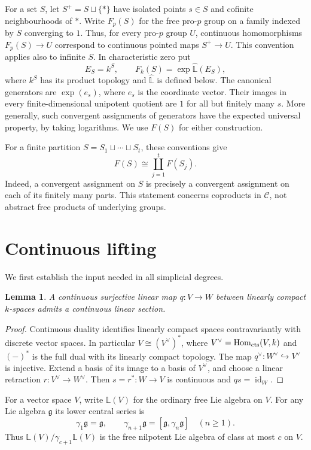 \documentclass[11pt,a4paper]{article}
\newtheorem{lemma}[theorem]{Lemma}
\theoremstyle{definition}
\newcommand{\C}{\mathcal C}
\newcommand{\Hom}{\operatorname{Hom}}
\newcommand{\LL}{\widehat{\mathbb L}}
\newcommand{\id}{\operatorname{id}}
\begin{document}
For a set $S$, let $S^+=S\sqcup\{*\}$ have isolated points $s\in S$
and cofinite neighbourhoods of $*$. Write $F_p(S)$ for the free pro-$p$
group on a family indexed by $S$ converging to $1$. Thus, for every
pro-$p$ group $U$, continuous homomorphisms $F_p(S)\to U$ correspond to
continuous pointed maps $S^+\to U$. This convention applies also to infinite $S$.
In characteristic zero put
\[
 E_S=k^S,\qquad F_k(S)=\exp\LL(E_S),
\]
where $k^S$ has its product topology and $\LL$ is defined below.
The canonical generators are $\exp(e_s)$, where $e_s$ is the coordinate
vector. Their images in every finite-dimensional unipotent quotient are
$1$ for all but finitely many $s$. More generally, such convergent
assignments of generators have the expected universal property, by
taking logarithms. We use $F(S)$ for either construction.

For a finite partition $S=S_1\sqcup\cdots\sqcup S_t$, these conventions give
\begin{equation}\label{eq:partition}
 F(S)\cong\coprod_{j=1}^t F(S_j).
\end{equation}
Indeed, a convergent assignment on $S$ is precisely a convergent
assignment on each of its finitely many parts. This statement concerns
coproducts in $\C$, not abstract free products of underlying groups.

\section{Continuous lifting}

We first establish the input needed in all simplicial degrees.

\begin{lemma}\label{lem:linear}
A continuous surjective linear map $q:V\to W$ between linearly compact
$k$-spaces admits a continuous linear section.
\end{lemma}
\begin{proof}
Continuous duality identifies linearly compact spaces contravariantly with
discrete vector spaces. In particular $V\cong(V^\vee)^*$, where
$V^\vee=\Hom_{\rm cts}(V,k)$ and $(-)^*$ is the full dual with its
linearly compact topology. The map $q^\vee:W^\vee\hookrightarrow V^\vee$
is injective. Extend a basis of its image to a basis of $V^\vee$, and
choose a linear retraction $r:V^\vee\to W^\vee$.
Then $s=r^*:W\to V$ is continuous and $qs=\id_W$.
\end{proof}

For a vector space $V$, write $\mathbb L(V)$ for the ordinary free Lie
algebra on $V$.  For any Lie algebra $\mathfrak g$ its lower central series is
\[
 \gamma_1\mathfrak g=\mathfrak g,\qquad
 \gamma_{n+1}\mathfrak g=[\mathfrak g,\gamma_n\mathfrak g]
 \quad(n\geq1).
\]
Thus $\mathbb L(V)/\gamma_{c+1}\mathbb L(V)$ is the free nilpotent Lie
algebra of class at most $c$ on $V$.
\end{document}
